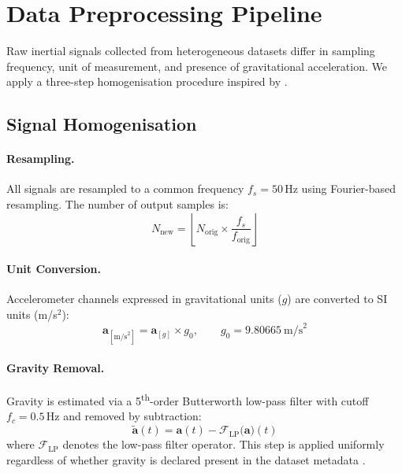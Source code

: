 \section{Data Preprocessing Pipeline}

Raw inertial signals collected from heterogeneous datasets differ in sampling
frequency, unit of measurement, and presence of gravitational acceleration.
We apply a three-step homogenisation procedure inspired by
\cite{amrani2025leveraging}.

\subsection{Signal Homogenisation}

\paragraph{Resampling.}
All signals are resampled to a common frequency $f_s = 50$\,Hz using
Fourier-based resampling. The number of output samples is:
\begin{equation}
    N_{\text{new}} = \left\lfloor N_{\text{orig}}
        \times \frac{f_s}{f_{\text{orig}}} \right\rfloor
    \label{eq:resample}
\end{equation}

\paragraph{Unit Conversion.}
Accelerometer channels expressed in gravitational units ($g$) are converted
to SI units (m/s$^2$):
\begin{equation}
    \mathbf{a}_{[\mathrm{m/s}^{2}]} = \mathbf{a}_{[g]} \times g_0,
    \qquad g_0 = 9.80665\ \mathrm{m/s}^{2}
    \label{eq:unit}
\end{equation}

\paragraph{Gravity Removal.}
Gravity is estimated via a 5\textsuperscript{th}-order Butterworth low-pass
filter with cutoff $f_c = 0.5$\,Hz and removed by subtraction:
\begin{equation}
    \tilde{\mathbf{a}}(t) = \mathbf{a}(t) - \mathcal{F}_{\mathrm{LP}}\bigl(\mathbf{a}\bigr)(t)
    \label{eq:gravity}
\end{equation}
where $\mathcal{F}_{\mathrm{LP}}$ denotes the low-pass filter operator.
This step is applied uniformly regardless of whether gravity is declared
present in the dataset metadata \cite{amrani2025leveraging}.

